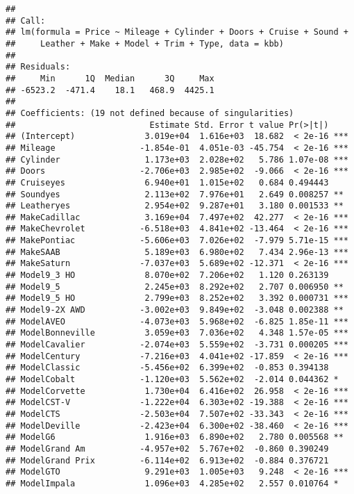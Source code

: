 \documentclass[
]{article}
\begin{document}
\begin{verbatim}
## 
## Call:
## lm(formula = Price ~ Mileage + Cylinder + Doors + Cruise + Sound + 
##     Leather + Make + Model + Trim + Type, data = kbb)
## 
## Residuals:
##     Min      1Q  Median      3Q     Max 
## -6523.2  -471.4    18.1   468.9  4425.1 
## 
## Coefficients: (19 not defined because of singularities)
##                           Estimate Std. Error t value Pr(>|t|)    
## (Intercept)              3.019e+04  1.616e+03  18.682  < 2e-16 ***
## Mileage                 -1.854e-01  4.051e-03 -45.754  < 2e-16 ***
## Cylinder                 1.173e+03  2.028e+02   5.786 1.07e-08 ***
## Doors                   -2.706e+03  2.985e+02  -9.066  < 2e-16 ***
## Cruiseyes                6.940e+01  1.015e+02   0.684 0.494443    
## Soundyes                 2.113e+02  7.976e+01   2.649 0.008257 ** 
## Leatheryes               2.954e+02  9.287e+01   3.180 0.001533 ** 
## MakeCadillac             3.169e+04  7.497e+02  42.277  < 2e-16 ***
## MakeChevrolet           -6.518e+03  4.841e+02 -13.464  < 2e-16 ***
## MakePontiac             -5.606e+03  7.026e+02  -7.979 5.71e-15 ***
## MakeSAAB                 5.189e+03  6.980e+02   7.434 2.96e-13 ***
## MakeSaturn              -7.037e+03  5.689e+02 -12.371  < 2e-16 ***
## Model9_3 HO              8.070e+02  7.206e+02   1.120 0.263139    
## Model9_5                 2.245e+03  8.292e+02   2.707 0.006950 ** 
## Model9_5 HO              2.799e+03  8.252e+02   3.392 0.000731 ***
## Model9-2X AWD           -3.002e+03  9.849e+02  -3.048 0.002388 ** 
## ModelAVEO               -4.073e+03  5.968e+02  -6.825 1.85e-11 ***
## ModelBonneville          3.059e+03  7.036e+02   4.348 1.57e-05 ***
## ModelCavalier           -2.074e+03  5.559e+02  -3.731 0.000205 ***
## ModelCentury            -7.216e+03  4.041e+02 -17.859  < 2e-16 ***
## ModelClassic            -5.456e+02  6.399e+02  -0.853 0.394138    
## ModelCobalt             -1.120e+03  5.562e+02  -2.014 0.044362 *  
## ModelCorvette            1.730e+04  6.416e+02  26.958  < 2e-16 ***
## ModelCST-V              -1.222e+04  6.303e+02 -19.388  < 2e-16 ***
## ModelCTS                -2.503e+04  7.507e+02 -33.343  < 2e-16 ***
## ModelDeville            -2.423e+04  6.300e+02 -38.460  < 2e-16 ***
## ModelG6                  1.916e+03  6.890e+02   2.780 0.005568 ** 
## ModelGrand Am           -4.957e+02  5.767e+02  -0.860 0.390249    
## ModelGrand Prix         -6.114e+02  6.913e+02  -0.884 0.376721    
## ModelGTO                 9.291e+03  1.005e+03   9.248  < 2e-16 ***
## ModelImpala              1.096e+03  4.285e+02   2.557 0.010764 *  

\end{verbatim}
\end{document}
